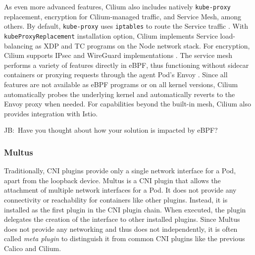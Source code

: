 \documentclass[english, 12pt, a4paper, sci, utf8, a-2b, online]{aaltothesis}
\newcommand{\mycomment}[3]{\textcolor{#1}{#2:~#3}}
\newcommand{\jb}[1]{\noindent\mycomment{aaltoRed}{JB}{#1}}
\begin{document}
As even more advanced features, Cilium also includes natively \texttt{kube-proxy} replacement, encryption for Cilium-managed traffic, and Service Mesh, among others. By default, \texttt{kube-proxy} uses \texttt{iptables} to route the Service traffic \cite{cilium-proxy-free}. With \texttt{kubeProxyReplacement} installation option, Cilium implements Service load-balancing as XDP and TC programs on the Node network stack. For encryption, Cilium supports IPsec and WireGuard implementations \cite{cilium-encryption}. The service mesh performs a variety of features directly in eBPF, thus functioning without sidecar containers or proxying requests through the agent Pod's Envoy \cite{cilium-service-mesh}. Since all features are not available as eBPF programs or on all kernel versions,  Cilium automatically probes the underlying kernel and automatically reverts to the Envoy proxy when needed. For capabilities beyond the built-in mesh, Cilium also provides integration with Istio.

\jb{Have you thought about how your solution is impacted by eBPF?}

\subsubsection{Multus}

Traditionally, CNI plugins provide only a single network interface for a Pod, apart from the loopback device. Multus \cite{multus-cni} is a CNI plugin that allows the attachment of multiple network interfaces for a Pod. It does not provide any connectivity or reachability for containers like other plugins. Instead, it is installed as the first plugin in the CNI plugin chain. When executed, the plugin delegates the creation of the interface to other installed plugins. Since Multus does not provide any networking and thus does not independently, it is often called \emph{meta plugin} to distinguish it from common CNI plugins like the previous Calico and Cilium.
\end{document}
